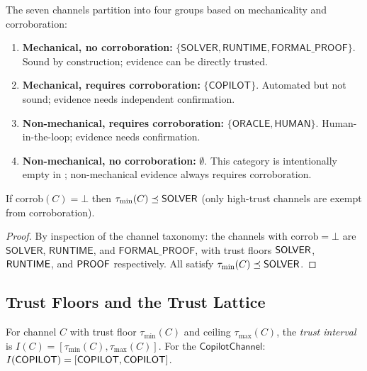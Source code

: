 \documentclass[11pt]{article}
\newcommand{\CopChan}{\mathsf{CopilotChannel}}
\begin{document}
The seven channels partition into four groups based on
mechanicality and corroboration:

\begin{definition}
\label{def:channel-class}
\begin{enumerate}
\item \textbf{Mechanical, no corroboration:} $\{\mathsf{SOLVER},
  \mathsf{RUNTIME}, \mathsf{FORMAL\_PROOF}\}$.  Sound by
  construction; evidence can be directly trusted.
\item \textbf{Mechanical, requires corroboration:}
  $\{\mathsf{COPILOT}\}$.  Automated but not sound; evidence
  needs independent confirmation.
\item \textbf{Non-mechanical, requires corroboration:}
  $\{\mathsf{ORACLE}, \mathsf{HUMAN}\}$.  Human-in-the-loop;
  evidence needs confirmation.
\item \textbf{Non-mechanical, no corroboration:}
  $\emptyset$.  This category is intentionally empty in \JuGeo{};
  non-mechanical evidence always requires corroboration.
\end{enumerate}
\end{definition}

\begin{lemma}
\label{lem:corrob-mono}
If $\mathrm{corrob}(C) = \bot$ then $\tau_{\min}(C) \preceq \mathsf{SOLVER}$
(\ie only high-trust channels are exempt from corroboration).
\end{lemma}

\begin{proof}
By inspection of the channel taxonomy: the channels with
$\mathrm{corrob} = \bot$ are $\mathsf{SOLVER}$,
$\mathsf{RUNTIME}$, and $\mathsf{FORMAL\_PROOF}$, with trust
floors $\mathsf{SOLVER}$, $\mathsf{RUNTIME}$, and $\mathsf{PROOF}$ respectively.
All satisfy $\tau_{\min}(C) \preceq \mathsf{SOLVER}$.
\end{proof}

\subsection{Trust Floors and the Trust Lattice}
\label{sec:arch:trust}

\begin{definition}
\label{def:trust-interval}
For channel $C$ with trust floor $\tau_{\min}(C)$ and
ceiling $\tau_{\max}(C)$, the \emph{trust interval} is
$I(C) = [\tau_{\min}(C), \tau_{\max}(C)]$.
For the $\CopChan$: $I(\mathsf{COPILOT}) = [\mathsf{COPILOT}, \mathsf{COPILOT}]$.
\end{definition}
\end{document}

